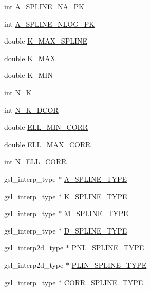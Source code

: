 \begin{DoxyCompactItemize}
\item 
int \mbox{\hyperlink{structccl__spline__params_a1e8edb8505e8a05d62df4d92999dacfc}{A\+\_\+\+S\+P\+L\+I\+N\+E\+\_\+\+N\+A\+\_\+\+PK}}
\item 
int \mbox{\hyperlink{structccl__spline__params_afebd711662e73360a7b18968ac5e8f40}{A\+\_\+\+S\+P\+L\+I\+N\+E\+\_\+\+N\+L\+O\+G\+\_\+\+PK}}
\item 
double \mbox{\hyperlink{structccl__spline__params_a2d964b09cc43201bee6c11e3b54aa26a}{K\+\_\+\+M\+A\+X\+\_\+\+S\+P\+L\+I\+NE}}
\item 
double \mbox{\hyperlink{structccl__spline__params_ab4952ddcd26e8645d5196db737650dfb}{K\+\_\+\+M\+AX}}
\item 
double \mbox{\hyperlink{structccl__spline__params_a69fe54941947403eb626f996ff941d73}{K\+\_\+\+M\+IN}}
\item 
int \mbox{\hyperlink{structccl__spline__params_aaded1b8452c591250ef44051fa8681a8}{N\+\_\+K}}
\item 
int \mbox{\hyperlink{structccl__spline__params_a68330cc26e66cb4eca93aca832ee6366}{N\+\_\+\+K\+\_\+D\+C\+OR}}
\item 
double \mbox{\hyperlink{structccl__spline__params_ab5be4e564bbd28fc51ffcbb0797957d5}{E\+L\+L\+\_\+\+M\+I\+N\+\_\+\+C\+O\+RR}}
\item 
double \mbox{\hyperlink{structccl__spline__params_a3407f2c11713c908ee9e5b6d8c36a1ac}{E\+L\+L\+\_\+\+M\+A\+X\+\_\+\+C\+O\+RR}}
\item 
int \mbox{\hyperlink{structccl__spline__params_ae38764273f047b530ffbc5ccb1935428}{N\+\_\+\+E\+L\+L\+\_\+\+C\+O\+RR}}
\item 
gsl\+\_\+interp\+\_\+type $\ast$ \mbox{\hyperlink{structccl__spline__params_af2971beb5a86401be3dc4b6533ec0650}{A\+\_\+\+S\+P\+L\+I\+N\+E\+\_\+\+T\+Y\+PE}}
\item 
gsl\+\_\+interp\+\_\+type $\ast$ \mbox{\hyperlink{structccl__spline__params_ad14251b631795d430f91f09834f90bca}{K\+\_\+\+S\+P\+L\+I\+N\+E\+\_\+\+T\+Y\+PE}}
\item 
gsl\+\_\+interp\+\_\+type $\ast$ \mbox{\hyperlink{structccl__spline__params_a488c1778d23bed9662e0b1af5cac0f12}{M\+\_\+\+S\+P\+L\+I\+N\+E\+\_\+\+T\+Y\+PE}}
\item 
gsl\+\_\+interp\+\_\+type $\ast$ \mbox{\hyperlink{structccl__spline__params_a2561d961fffd4a95d0f8276162747f1d}{D\+\_\+\+S\+P\+L\+I\+N\+E\+\_\+\+T\+Y\+PE}}
\item 
gsl\+\_\+interp2d\+\_\+type $\ast$ \mbox{\hyperlink{structccl__spline__params_a0f5ea33f8960f01c3d802109e06feb21}{P\+N\+L\+\_\+\+S\+P\+L\+I\+N\+E\+\_\+\+T\+Y\+PE}}
\item 
gsl\+\_\+interp2d\+\_\+type $\ast$ \mbox{\hyperlink{structccl__spline__params_abad631f5a17908c332c846cf32c1d66e}{P\+L\+I\+N\+\_\+\+S\+P\+L\+I\+N\+E\+\_\+\+T\+Y\+PE}}
\item 
gsl\+\_\+interp\+\_\+type $\ast$ \mbox{\hyperlink{structccl__spline__params_a626831cd3240afa8801a5575382f4989}{C\+O\+R\+R\+\_\+\+S\+P\+L\+I\+N\+E\+\_\+\+T\+Y\+PE}}
\end{DoxyCompactItemize}


